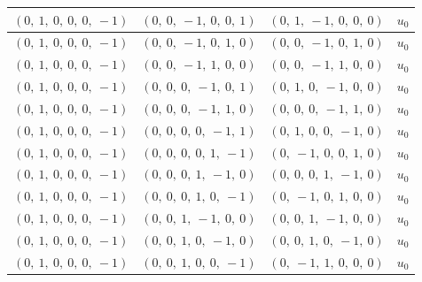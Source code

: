 \documentclass[11pt]{article}
\theoremstyle{definition}
\begin{document}
\begin{longtable}{|l|l|l|c|}
    \hline
    $\left( 0, \  1, \  0, \  0, \  0, \  -1\right)$ & $\left( 0, \  0, \  -1, \  0, \  0, \  1\right)$ & $\left( 0, \  1, \  -1, \  0, \  0, \  0\right)$ & $u_{0}$ \\
    \hline
    $\left( 0, \  1, \  0, \  0, \  0, \  -1\right)$ & $\left( 0, \  0, \  -1, \  0, \  1, \  0\right)$ & $\left( 0, \  0, \  -1, \  0, \  1, \  0\right)$ & $u_{0}$ \\
    \hline
    $\left( 0, \  1, \  0, \  0, \  0, \  -1\right)$ & $\left( 0, \  0, \  -1, \  1, \  0, \  0\right)$ & $\left( 0, \  0, \  -1, \  1, \  0, \  0\right)$ & $u_{0}$ \\
    \hline
    $\left( 0, \  1, \  0, \  0, \  0, \  -1\right)$ & $\left( 0, \  0, \  0, \  -1, \  0, \  1\right)$ & $\left( 0, \  1, \  0, \  -1, \  0, \  0\right)$ & $u_{0}$ \\
    \hline
    $\left( 0, \  1, \  0, \  0, \  0, \  -1\right)$ & $\left( 0, \  0, \  0, \  -1, \  1, \  0\right)$ & $\left( 0, \  0, \  0, \  -1, \  1, \  0\right)$ & $u_{0}$ \\
    \hline
    $\left( 0, \  1, \  0, \  0, \  0, \  -1\right)$ & $\left( 0, \  0, \  0, \  0, \  -1, \  1\right)$ & $\left( 0, \  1, \  0, \  0, \  -1, \  0\right)$ & $u_{0}$ \\
    \hline
    $\left( 0, \  1, \  0, \  0, \  0, \  -1\right)$ & $\left( 0, \  0, \  0, \  0, \  1, \  -1\right)$ & $\left( 0, \  -1, \  0, \  0, \  1, \  0\right)$ & $u_{0}$ \\
    \hline
    $\left( 0, \  1, \  0, \  0, \  0, \  -1\right)$ & $\left( 0, \  0, \  0, \  1, \  -1, \  0\right)$ & $\left( 0, \  0, \  0, \  1, \  -1, \  0\right)$ & $u_{0}$ \\
    \hline
    $\left( 0, \  1, \  0, \  0, \  0, \  -1\right)$ & $\left( 0, \  0, \  0, \  1, \  0, \  -1\right)$ & $\left( 0, \  -1, \  0, \  1, \  0, \  0\right)$ & $u_{0}$ \\
    \hline
    $\left( 0, \  1, \  0, \  0, \  0, \  -1\right)$ & $\left( 0, \  0, \  1, \  -1, \  0, \  0\right)$ & $\left( 0, \  0, \  1, \  -1, \  0, \  0\right)$ & $u_{0}$ \\
    \hline
    $\left( 0, \  1, \  0, \  0, \  0, \  -1\right)$ & $\left( 0, \  0, \  1, \  0, \  -1, \  0\right)$ & $\left( 0, \  0, \  1, \  0, \  -1, \  0\right)$ & $u_{0}$ \\
    \hline
    $\left( 0, \  1, \  0, \  0, \  0, \  -1\right)$ & $\left( 0, \  0, \  1, \  0, \  0, \  -1\right)$ & $\left( 0, \  -1, \  1, \  0, \  0, \  0\right)$ & $u_{0}$ \\

\end{longtable}
\end{document}
